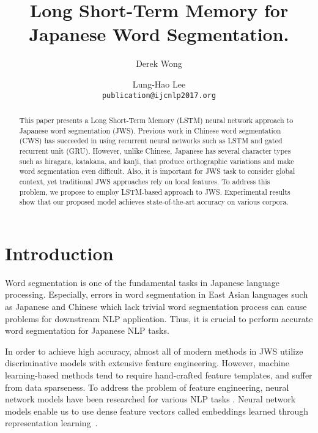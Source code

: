 \documentclass[11pt,letterpaper]{article}
\title{Long Short-Term Memory for Japanese Word Segmentation.}
\author{Derek Wong\and Lung-Hao Lee \\
  {\tt publication@ijcnlp2017.org}}
\date{}
\begin{document}
\maketitle

\setlength{\abovedisplayskip}{2pt} %
\setlength{\belowdisplayskip}{2pt} %

\begin{abstract}
This paper presents a Long Short-Term Memory (LSTM) neural network approach to Japanese word segmentation (JWS). 
Previous work in Chinese word segmentation (CWS) has succeeded in using recurrent neural networks such as LSTM and gated recurrent unit (GRU). 
However, unlike Chinese, Japanese has several character types such as hiragara, katakana, and kanji, that produce orthographic variations and make word segmentation even difficult. 
Also, it is important for JWS task to consider global context, yet traditional JWS approaches rely on local features.
To address this problem, we propose to employ LSTM-based approach to JWS. 
Experimental results show that our proposed model achieves state-of-the-art accuracy on various corpora. 

\end{abstract}

\section{Introduction}
Word segmentation is one of the fundamental tasks in Japanese language processing. 
Especially, errors in word segmentation in East Asian languages such as Japanese and Chinese which lack trivial word segmentation process can cause problems for downstream NLP application.
Thus, it is crucial to perform accurate word segmentation for Japanese NLP tasks.


In order to achieve high accuracy, almost all of modern methods in JWS utilize discriminative models with extensive feature engineering.
However, machine learning-based methods tend to require hand-crafted feature templates, and suffer from data sparseness.
To address the problem of feature engineering, neural network models have been researched for various NLP tasks \cite{liu2015multi,sutskever2014sequence,socher2013parsing,turian2010word,mikolov2013distributed}.
Neural network models enable us to use dense feature vectors called embeddings learned through representation learning~\cite{NIPS20135021}. 
\end{document}
